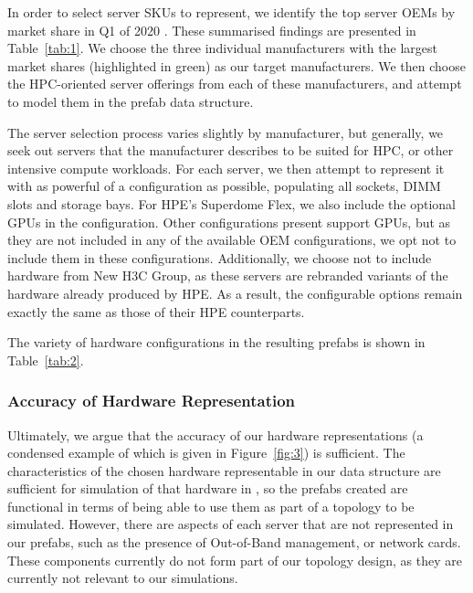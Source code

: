 \documentclass[11pt]{article}
\begin{document}
			In order to select server SKUs to represent, we identify the top server OEMs by market share in Q1 of 2020 \cite{Macatee2020}. These summarised findings are presented in Table~\ref{tab:1}.
			We choose the three individual manufacturers with the largest market shares (highlighted in green) as our target manufacturers.
			We then choose the HPC-oriented server offerings from each of these manufacturers, and attempt to model them in the prefab data structure.
			
			The server selection process varies slightly by manufacturer, but generally, we seek out servers that the manufacturer describes to be suited for HPC, or other intensive compute workloads.
			For each server, we then attempt to represent it with as powerful of a configuration as possible, populating all sockets, DIMM slots and storage bays.
			For HPE's Superdome Flex, we also include the optional GPUs in the configuration.
			Other configurations present support GPUs, but as they are not included in any of the available OEM configurations, we opt not to include them in these configurations.
			Additionally, we choose not to include hardware from New H3C Group, as these servers are rebranded variants of the hardware already produced by HPE.
			As a result, the configurable options remain exactly the same as those of their HPE counterparts.

			The variety of hardware configurations in the resulting prefabs is shown in Table~\ref{tab:2}.



		\subsubsection{Accuracy of Hardware Representation}
			Ultimately, we argue that the accuracy of our hardware representations (a condensed example of which is given in Figure~\ref{fig:3}) is sufficient.
			The characteristics of the chosen hardware representable in our data structure are sufficient for simulation of that hardware in \opendc{}, so the prefabs created are functional in terms of being able to use them as part of a topology to be simulated.
			However, there are aspects of each server that are not represented in our prefabs, such as the presence of Out-of-Band management, or network cards.
			These components currently do not form part of our topology design, as they are currently not relevant to our simulations.
\end{document}
